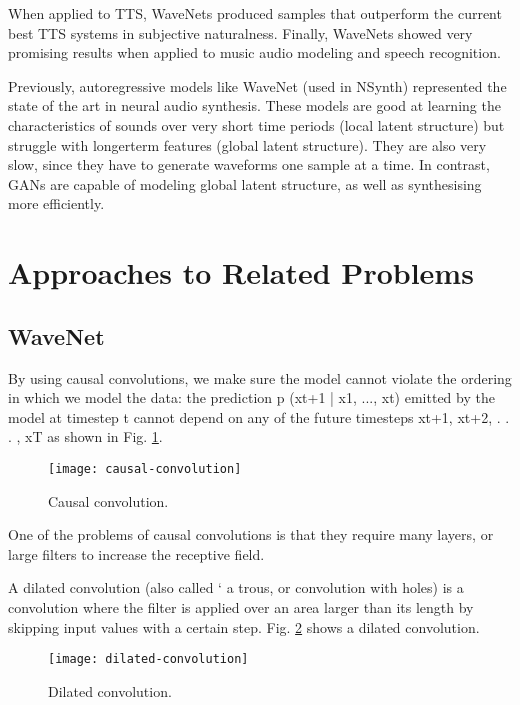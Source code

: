 When applied to TTS, WaveNets produced samples that outperform the current best TTS systems in subjective naturalness. Finally, WaveNets showed very promising results when applied to music audio modeling and speech recognition.

Previously, autoregressive models like WaveNet (used in NSynth) represented the state of the art in neural audio synthesis. These models are good at learning the characteristics of sounds over very short time periods (local latent structure) but struggle with longerterm features (global latent structure). They are also very slow, since they have to generate waveforms one sample at a time. In contrast, GANs are capable of modeling global latent structure, as well as synthesising more efficiently. \cite{tahiroglu_-terity_2020}

\section{Approaches to Related Problems} \label{sec:approaches}

\subsection{WaveNet} \label{subsec:approach-wavenet}

By using causal convolutions, we make sure the model cannot violate the ordering in which we model the data: the prediction p (xt+1 | x1, ..., xt) emitted by the model at timestep t cannot depend on any of the future timesteps xt+1, xt+2, . . . , xT as shown in Fig. \ref{fig:causal-convolution}. \cite{oord_wavenet_2016}

\begin{figure}[h]
    \caption{Causal convolution.}
    \centering
    \texttt{[image: causal-convolution]}
    \label{fig:causal-convolution}
\end{figure}

One of the problems of causal convolutions is that they require many layers, or large filters to increase the receptive field.

A dilated convolution (also called ` a trous, or convolution with holes) is a convolution where the filter is applied over an area larger than its length by skipping input values with a certain step. Fig. \ref{fig:dilated-convolution} shows a dilated convolution.

\begin{figure}[h]
    \caption{Dilated convolution.}
    \centering
    \texttt{[image: dilated-convolution]}
    \label{fig:dilated-convolution}
\end{figure}

